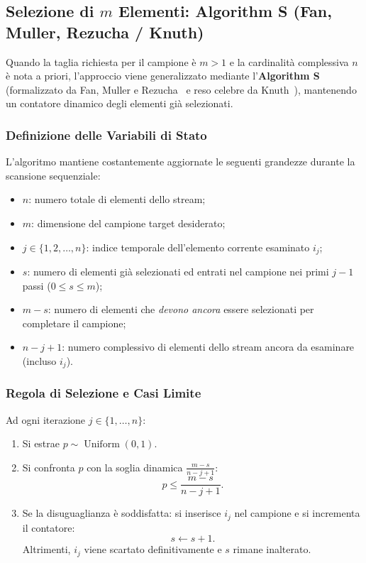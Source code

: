 \FloatBarrier
\subsection{Selezione di \texorpdfstring{$m$}{m} Elementi: Algorithm S (Fan, Muller, Rezucha / Knuth)}
Quando la taglia richiesta per il campione è $m > 1$ e la cardinalità complessiva $n$ è nota a priori, l'approccio viene generalizzato mediante l'\textbf{Algorithm S} (formalizzato da Fan, Muller e Rezucha~\cite{fan1962} e reso celebre da Knuth~\cite{knuth1997}), mantenendo un contatore dinamico degli elementi già selezionati.

\subsubsection{Definizione delle Variabili di Stato}
L'algoritmo mantiene costantemente aggiornate le seguenti grandezze durante la scansione sequenziale:
\begin{itemize}
  \item $n$: numero totale di elementi dello stream;
  \item $m$: dimensione del campione target desiderato;
  \item $j \in \{1, 2, \dots, n\}$: indice temporale dell'elemento corrente esaminato $i_j$;
  \item $s$: numero di elementi già selezionati ed entrati nel campione nei primi $j - 1$ passi ($0 \le s \le m$);
  \item $m - s$: numero di elementi che \emph{devono ancora} essere selezionati per completare il campione;
  \item $n - j + 1$: numero complessivo di elementi dello stream ancora da esaminare (incluso $i_j$).
\end{itemize}

\subsubsection{Regola di Selezione e Casi Limite}
Ad ogni iterazione $j \in \{1, \dots, n\}$:
\begin{enumerate}
  \item Si estrae $p \sim \operatorname{Uniform}(0, 1)$.
  \item Si confronta $p$ con la soglia dinamica $\frac{m - s}{n - j + 1}$:
  \begin{equation}
    p \le \frac{m - s}{n - j + 1}.
    \label{eq:algorithm-s-threshold}
  \end{equation}
  \item Se la disuguaglianza è soddisfatta: si inserisce $i_j$ nel campione e si incrementa il contatore:
  \begin{equation}
    s \leftarrow s + 1.
  \end{equation}
  Altrimenti, $i_j$ viene scartato definitivamente e $s$ rimane inalterato.
\end{enumerate}

